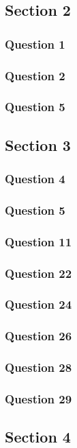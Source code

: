 \documentclass{article}
\begin{document}
\subsection{Section 2}
\subsubsection{Question 1}
\subsubsection{Question 2}
\subsubsection{Question 5}

\subsection{Section 3}
\subsubsection{Question 4}
\subsubsection{Question 5}
\subsubsection{Question 11}
\subsubsection{Question 22}
\subsubsection{Question 24}
\subsubsection{Question 26}
\subsubsection{Question 28}
\subsubsection{Question 29}

\subsection{Section 4}
\end{document}
